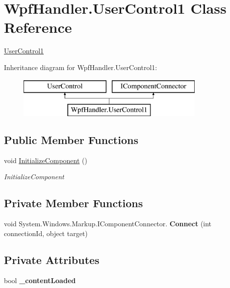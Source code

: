 \hypertarget{class_wpf_handler_1_1_user_control1}{}\section{Wpf\+Handler.\+User\+Control1 Class Reference}
\label{class_wpf_handler_1_1_user_control1}


\mbox{\hyperlink{class_wpf_handler_1_1_user_control1}{User\+Control1}}  


Inheritance diagram for Wpf\+Handler.\+User\+Control1\+:\begin{figure}[H]
\begin{center}
\leavevmode
\includegraphics[height=2.000000cm]{dd/d5d/class_wpf_handler_1_1_user_control1}
\end{center}
\end{figure}
\subsection*{Public Member Functions}
\begin{DoxyCompactItemize}
\item 
void \mbox{\hyperlink{class_wpf_handler_1_1_user_control1_a4be9da09a92a3fd301a67bf224d2f3d5}{Initialize\+Component}} ()
\begin{DoxyCompactList}\small\item\em Initialize\+Component \end{DoxyCompactList}\end{DoxyCompactItemize}
\subsection*{Private Member Functions}
\begin{DoxyCompactItemize}
\item 
\mbox{\label{class_wpf_handler_1_1_user_control1_aa7f1658efb648be3e096fdb65e9d9573}} 
void System.\+Windows.\+Markup.\+I\+Component\+Connector. {\bfseries Connect} (int connection\+Id, object target)
\end{DoxyCompactItemize}
\subsection*{Private Attributes}
\begin{DoxyCompactItemize}
\item 
\mbox{\label{class_wpf_handler_1_1_user_control1_a5205c49dc7ecde88eb8ed4a0f3468b47}} 
bool {\bfseries \+\_\+content\+Loaded}
\end{DoxyCompactItemize}


